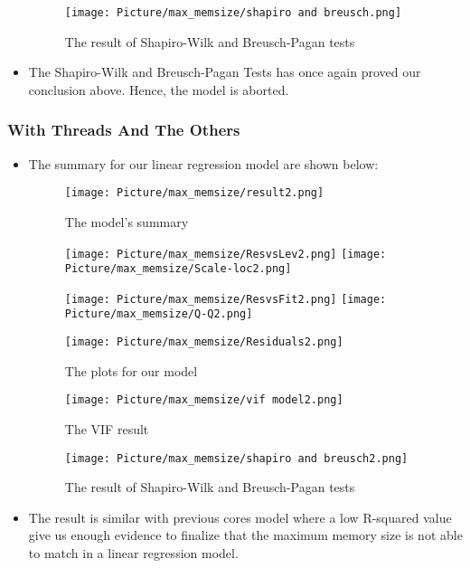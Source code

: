 \documentclass[a4paper]{article}
\begin{document}
\begin{itemize}
    \begin{figure}[H]
        \centering
        \texttt{[image: Picture/max\_memsize/shapiro and breusch.png]}
        \caption{The result of Shapiro-Wilk and Breusch-Pagan tests}
        \label{8.3.4}
    \end{figure}
    
    \item[] The Shapiro-Wilk and Breusch-Pagan Tests has once again proved our conclusion above. Hence, the model is aborted.
    
    \end{itemize}
\subsubsection{With Threads And The Others} 
\begin{itemize}
    \item[] The summary for our linear regression model are shown below:

    \begin{figure}[H]
        \centering
        \texttt{[image: Picture/max\_memsize/result2.png]}
        \caption{The model's summary}
        \label{8.3.1}
    \end{figure} 
    
    \begin{figure}[H]
        \centering
        \texttt{[image: Picture/max\_memsize/ResvsLev2.png]}
        \texttt{[image: Picture/max\_memsize/Scale-loc2.png]}
        \label{8.3.2}
    \end{figure}
    
    \begin{figure}[H]
        \centering
        \texttt{[image: Picture/max\_memsize/ResvsFit2.png]}
        \texttt{[image: Picture/max\_memsize/Q-Q2.png]}
        \label{8.3.3}
    \end{figure}
    
    \begin{figure}[H]
        \centering
        \texttt{[image: Picture/max\_memsize/Residuals2.png]}
        \caption{The plots for our model}
        \label{8.3.4}
    \end{figure}
    
    \begin{figure}[H]
        \centering
        \texttt{[image: Picture/max\_memsize/vif model2.png]}
        \caption{The VIF result}
        \label{8.3.4}
    \end{figure}
    
    \begin{figure}[H]
        \centering
        \texttt{[image: Picture/max\_memsize/shapiro and breusch2.png]}
        \caption{The result of Shapiro-Wilk and Breusch-Pagan tests}
        \label{8.3.4}
    \end{figure}
    
    \item[] The result is similar with previous cores model where a low R-squared value give us enough evidence to finalize that the maximum memory size is not able to match in a linear regression model.
    \end{itemize}
\end{document}
